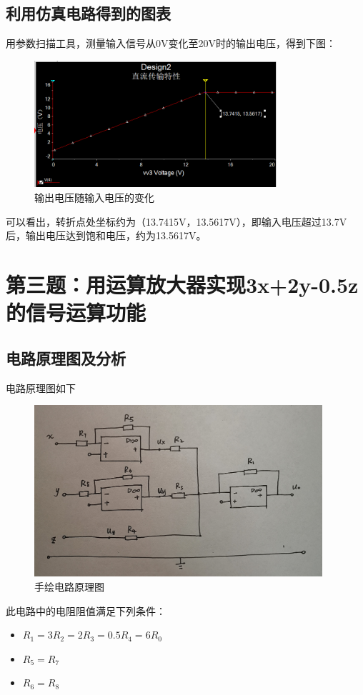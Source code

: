 \documentclass[UTF8]{ctexart}
\begin{document}
\subsection{利用仿真电路得到的图表}
用参数扫描工具，测量输入信号从0V变化至20V时的输出电压，得到下图：
\begin{figure}[H]
\centering
\includegraphics[width=0.8\textwidth]{D.png}
\caption{输出电压随输入电压的变化}
\end{figure}
可以看出，转折点处坐标约为（13.7415V，13.5617V），即输入电压超过13.7V后，输出电压达到饱和电压，约为13.5617V。
\section{第三题：用运算放大器实现3x+2y-0.5z的信号运算功能}
\subsection{电路原理图及分析}
电路原理图如下
\begin{figure}[H]
\centering
\includegraphics[width=0.95\textwidth]{F.jpg}
\caption{手绘电路原理图}
\end{figure}
此电路中的电阻阻值满足下列条件：
\begin{itemize}
\item $R_1=3R_2=2R_3=0.5R_4=6R_0$
\item $R_5=R_7$
\item $R_6=R_8$
\end{itemize}
\end{document}
